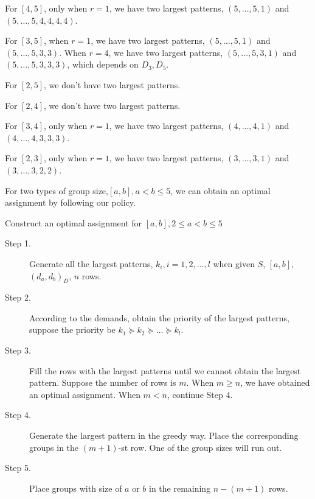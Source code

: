 \begin{lem}
For $[4,5]$, only when $r=1$, we have two largest patterns,
  $(5,\ldots,5,1)$ and $(5,\ldots,5,4,4,4,4)$.

For $[3,5]$, when $r=1$, we have two largest patterns, $(5,\ldots,5,1)$ and $(5,\ldots,5,3,3)$. When $r=4$, we have two largest patterns, $(5,\ldots,5,3,1)$ and $(5,\ldots,5,3,3,3)$, which depends on $D_3,D_5$.

For $[2,5]$, we don't have two largest patterns.

For $[2,4]$, we don't have two largest patterns.

For $[3,4]$, only when $r=1$, we have two largest patterns, $(4,\ldots,4,1)$ and $(4,\ldots,4,3,3,3)$.

For $[2,3]$, only when $r=1$, we have two largest patterns, $(3,\ldots,3,1)$ and $(3,\ldots,3,2,2)$.
\end{lem}

\begin{thm}
For two types of group size,$[a,b], a < b \leq 5$, we can obtain an optimal assignment by following our policy.
\end{thm}

\begin{algorithm}[H]\label{algo2}
\caption{Construct an optimal assignment for $[a,b], 2 \leq a<b \leq 5$}
\begin{description}
  \item[Step 1.] Generate all the largest patterns, $k_i,i=1,2,\ldots,l$ when given $S$, $[a,b]$, $(d_a,d_b)_D$, $n$ rows.
  \vspace{10pt}
  \item[Step 2.] According to the demands, obtain the priority of the largest patterns, suppose the priority be $k_1 \succeq k_2 \succeq \ldots \succeq k_l$.
	\vspace{10pt}
  \item[Step 3.] Fill the rows with the largest patterns until we cannot obtain the largest pattern. Suppose the number of rows is $m$. When $m \geq n$, we have obtained an optimal assignment. When $m <n$, continue Step 4.
  \item[Step 4.] Generate the largest pattern in the greedy way. Place the corresponding groups in the $(m+1)$-st row. One of the group sizes will run out.
  \item[Step 5.] Place groups with size of $a$ or $b$ in the remaining $n-(m+1)$ rows.
\end{description}
\end{algorithm}


